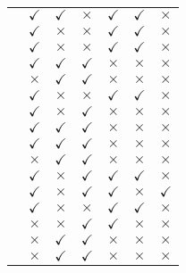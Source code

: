 \begin{table}[h]
\begin{tabular}{p{4.8cm}cccccc}
\cite{Ahmadi-2011} & $\checkmark$  &  $\checkmark$ &  $\times$ & $\checkmark$ & $\checkmark$ & $\times$\\
\cite{Deb2012} &  $\checkmark$ &  $\times$ &  $\times$ & $\checkmark$ & $\checkmark$ & $\times$\\
\cite{Basu-11} &  $\checkmark$ &  $\times$ &  $\times$ & $\checkmark$ & $\checkmark$ & $\times$\\
\cite{Berrios-2011} &  $\checkmark$ &  $\checkmark$ &  $\checkmark$ & $\times$ & $\times$ & $\times$\\
\cite{Habi-2011} &  $\times$ &  $\checkmark$ &  $\checkmark$ & $\times$ & $\times$ & $\times$\\
\cite{Mazur-2009} &  $\checkmark$ &  $\times$ &  $\times$ & $\checkmark$ & $\checkmark$ & $\times$\\
\cite{Moon-2011} &  $\checkmark$ &  $\times$ &  $\checkmark$ & $\times$ & $\times$ & $\times$\\
\cite{Liu2010} &  $\checkmark$ &  $\checkmark$ &  $\checkmark$ & $\times$ & $\times$ & $\times$\\
\cite{Bare-2005} &  $\checkmark$ &  $\checkmark$ &  $\checkmark$ & $\times$ & $\times$ & $\times$\\
\cite{Mastacan-2005} &  $\times$ &  $\checkmark$ &  $\checkmark$ & $\times$ & $\times$ & $\times$\\
\cite{Rashidi-2011} &  $\checkmark$ &  $\times$ &  $\checkmark$ & $\checkmark$ & $\checkmark$ & $\times$\\
\cite{Suresh-2011} &  $\checkmark$ &  $\times$ &  $\checkmark$ & $\checkmark$ & $\times$ & $\checkmark$\\
\cite{Sayyaadi-2011} &  $\checkmark$ &  $\times$ &  $\times$ & $\checkmark$ & $\checkmark$ & $\times$\\
\cite{Saez-2007} &  $\times$ &  $\times$ &  $\checkmark$ & $\checkmark$ & $\times$ & $\times$\\
\cite{Kwun-2007} &  $\times$ &  $\checkmark$ &  $\checkmark$ & $\times$ & $\times$ & $\times$\\
\cite{Tamiru-2009} &  $\times$ &  $\checkmark$ &  $\checkmark$ & $\times$ & $\times$ & $\times$\\
 \bottomrule
 \end{tabular}
\end{table}

